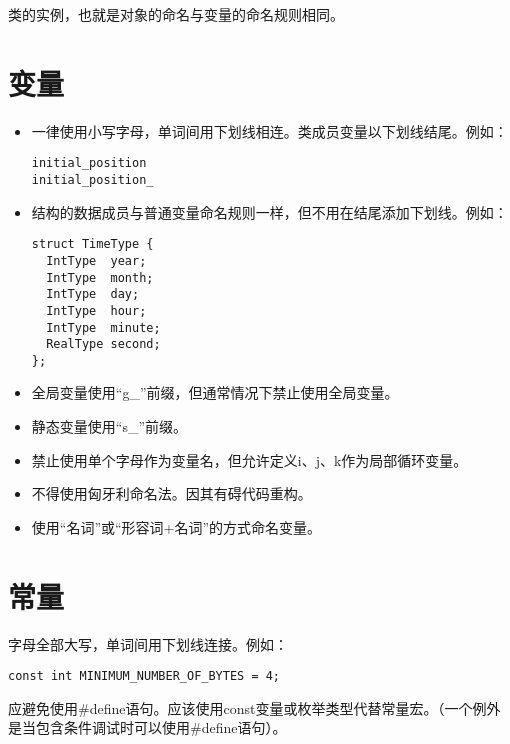 类的实例，也就是对象的命名与变量的命名规则相同。


\section{变量}
\begin{itemize}
  \item 一律使用小写字母，单词间用下划线相连。类成员变量以下划线结尾。例如：
  \begin{verbatim}
initial_position
initial_position_
  \end{verbatim}
  \item 结构的数据成员与普通变量命名规则一样，但不用在结尾添加下划线。例如：
  \begin{verbatim}
struct TimeType {
  IntType  year;
  IntType  month;
  IntType  day;
  IntType  hour;
  IntType  minute;
  RealType second;
};
  \end{verbatim}
  \item 全局变量使用“g\_”前缀，但通常情况下禁止使用全局变量。
  \item 静态变量使用“s\_”前缀。
  \item 禁止使用单个字母作为变量名，但允许定义i、j、k作为局部循环变量。
  \item 不得使用匈牙利命名法。因其有碍代码重构。
  \item 使用“名词”或“形容词+名词”的方式命名变量。
\end{itemize}


\section{常量}
字母全部大写，单词间用下划线连接。例如：
\begin{verbatim}
const int MINIMUM_NUMBER_OF_BYTES = 4;
\end{verbatim}

应避免使用\#define语句。应该使用const变量或枚举类型代替常量宏。（一个例外是当包含条件调试时可以使用\#define语句）。


